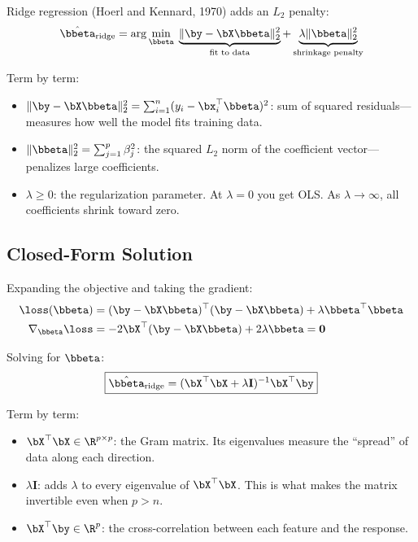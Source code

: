 Ridge regression (Hoerl and Kennard, 1970) adds an $L_2$ penalty:
\begin{equation}
\hat{\bbeta}_{\mathrm{ridge}} = \arg\min_{\bbeta} \; \underbrace{\| \by - \bX \bbeta \|_2^2}_{\text{fit to data}} + \underbrace{\lambda \| \bbeta \|_2^2}_{\text{shrinkage penalty}}
\label{eq:ridge-objective}
\end{equation}

Term by term:
\begin{itemize}[nosep]
  \item $\| \by - \bX \bbeta \|_2^2 = \sum_{i=1}^n (y_i - \bx_i^\top \bbeta)^2$: sum of squared residuals---measures how well the model fits training data.
  \item $\| \bbeta \|_2^2 = \sum_{j=1}^p \beta_j^2$: the squared $L_2$ norm of the coefficient vector---penalizes large coefficients.
  \item $\lambda \geq 0$: the regularization parameter. At $\lambda = 0$ you get OLS. As $\lambda \to \infty$, all coefficients shrink toward zero.
\end{itemize}

\subsection{Closed-Form Solution}

Expanding the objective and taking the gradient:
\begin{align}
\loss(\bbeta) &= (\by - \bX\bbeta)^\top(\by - \bX\bbeta) + \lambda \bbeta^\top \bbeta \notag \\
\nabla_{\bbeta} \loss &= -2\bX^\top(\by - \bX\bbeta) + 2\lambda \bbeta = \mathbf{0}
\end{align}

Solving for $\bbeta$:
\begin{equation}
\boxed{\hat{\bbeta}_{\mathrm{ridge}} = (\bX^\top \bX + \lambda \mathbf{I})^{-1} \bX^\top \by}
\label{eq:ridge-closed-form}
\end{equation}

Term by term:
\begin{itemize}[nosep]
  \item $\bX^\top \bX \in \R^{p \times p}$: the Gram matrix. Its eigenvalues measure the ``spread'' of data along each direction.
  \item $\lambda \mathbf{I}$: adds $\lambda$ to every eigenvalue of $\bX^\top \bX$. This is what makes the matrix invertible even when $p > n$.
  \item $\bX^\top \by \in \R^p$: the cross-correlation between each feature and the response.
\end{itemize}

